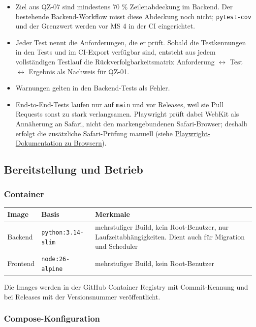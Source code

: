 \documentclass[11pt,a4paper]{article}
\begin{document}
\begin{itemize}
\item Ziel aus QZ-07 sind mindestens 70 \% Zeilenabdeckung im Backend. Der bestehende Backend-Workflow misst diese Abdeckung noch nicht; \texttt{pytest-cov} und der Grenzwert werden vor MS 4 in der CI eingerichtet.
\item Jeder Test nennt die Anforderungen, die er prüft. Sobald die Testkennungen in den Tests und im CI-Export verfügbar sind, entsteht aus jedem vollständigen Testlauf die Rückverfolgbarkeitsmatrix Anforderung $\leftrightarrow$ Test $\leftrightarrow$ Ergebnis als Nachweis für QZ-01.
\item Warnungen gelten in den Backend-Tests als Fehler.
\item End-to-End-Tests laufen nur auf \texttt{main} und vor Releases, weil sie Pull Requests sonst zu stark verlangsamen. Playwright prüft dabei WebKit als Annäherung an Safari, nicht den markengebundenen Safari-Browser; deshalb erfolgt die zusätzliche Safari-Prüfung manuell (siehe \href{https://playwright.dev/docs/browsers}{Playwright-Dokumentation zu Browsern}).
\end{itemize}


\subsection{Bereitstellung und Betrieb}

\subsubsection{Container}

\begin{tabularx}{\linewidth}{@{}l >{\hsize=0.65\hsize\RaggedRight\arraybackslash}X >{\hsize=1.35\hsize\RaggedRight\arraybackslash}X@{}}
\toprule
\textbf{Image} & \textbf{Basis} & \textbf{Merkmale} \\
\midrule
\endhead
Backend & \texttt{python:3.14-slim} & mehrstufiger Build, kein Root-Benutzer, nur Laufzeitabhängigkeiten. Dient auch für Migration und Scheduler \\
Frontend & \texttt{node:26-alpine} & mehrstufiger Build, kein Root-Benutzer \\
\bottomrule
\end{tabularx}

Die Images werden in der GitHub Container Registry mit Commit-Kennung und bei Releases mit der Versionsnummer veröffentlicht.

\subsubsection{Compose-Konfiguration}
\end{document}

